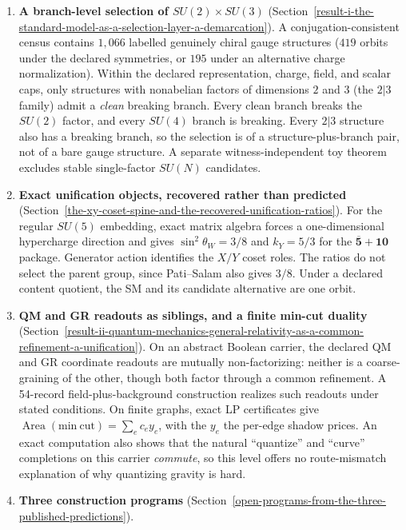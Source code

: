 \begin{enumerate}
\item
  \textbf{A branch-level selection of \(SU(2)\times SU(3)\)} (Section~\ref{result-i-the-standard-model-as-a-selection-layer-a-demarcation}).
  A conjugation-consistent census contains \(1{,}066\) labelled genuinely chiral gauge structures (\(419\) orbits under
  the declared symmetries, or \(195\) under an alternative charge normalization). Within the declared representation,
  charge, field, and scalar caps, only structures with nonabelian factors of dimensions \(2\) and \(3\) (the
  \(2|3\) family) admit a \emph{clean} breaking branch. Every clean branch breaks the \(SU(2)\) factor, and every
  \(SU(4)\) branch is breaking. Every \(2|3\) structure also has a breaking branch, so the selection is of a
  structure-plus-branch pair, not of a bare gauge structure. A separate witness-independent toy theorem excludes stable
  single-factor \(SU(N)\) candidates.
\item
  \textbf{Exact unification objects, recovered rather than predicted} (Section~\ref{the-xy-coset-spine-and-the-recovered-unification-ratios}).
  For the regular \(SU(5)\) embedding, exact matrix algebra forces a one-dimensional hypercharge direction and gives
  \(\sin^2\theta_W=3/8\) and \(k_Y=5/3\) for the \(\overline{\mathbf5}+\mathbf{10}\) package. Generator action
  identifies the \(X/Y\) coset roles. The ratios do not select the parent group, since Pati--Salam also gives \(3/8\).
  Under a declared content quotient, the SM and its candidate alternative are one orbit.
\item
  \textbf{QM and GR readouts as siblings, and a finite min-cut duality} (Section~\ref{result-ii-quantum-mechanics-general-relativity-as-a-common-refinement-a-unification}).
  On an abstract Boolean carrier, the declared QM and GR coordinate readouts are mutually non-factorizing: neither is a
  coarse-graining of the other, though both factor through a common refinement. A 54-record field-plus-background
  construction realizes such readouts under stated conditions. On finite graphs, exact LP certificates give
  \(\operatorname{Area}(\mathrm{min\ cut})=\sum_e c_e y_e\), with the \(y_e\) the per-edge shadow prices. An exact
  computation also shows that the natural ``quantize'' and ``curve'' completions on this carrier \emph{commute}, so
  this level offers no route-mismatch explanation of why quantizing gravity is hard.
\item
  \textbf{Three construction programs} (Section~\ref{open-programs-from-the-three-published-predictions}).

\end{enumerate}
